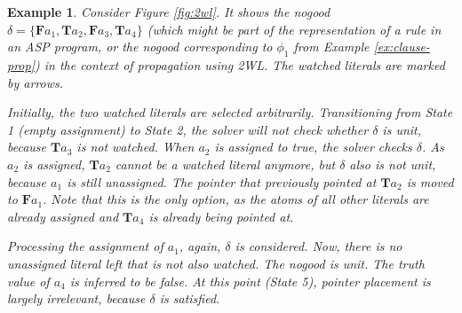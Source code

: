 \documentclass[final]{vutinfth} %
\newtheorem{example}{Example}[chapter]
\newcommand{\bT}{\mathbf{T}}
\newcommand{\bF}{\mathbf{F}}
\begin{document}
\begin{example}
Consider Figure \ref{fig:2wl}. It shows the nogood $\delta = \{\bF a_1, \bT a_2, \bF a_3, \bT a_4 \}$ (which might be part of the representation of a rule in an ASP program, or the nogood corresponding to $\phi_1$ from Example \ref{ex:clause-prop}) in the context of propagation using 2WL. The watched literals are marked by arrows.

Initially, the two watched literals are selected arbitrarily. Transitioning from State 1 (empty assignment) to State 2, the solver will not check whether $\delta$ is unit, because $\bT a_3$ is not watched. When $a_2$ is assigned to \emph{true}, the solver checks $\delta$. As $a_2$ is assigned, $\bT a_2$ cannot be a watched literal anymore, but $\delta$ also is not unit, because $a_1$ is still unassigned. The pointer that previously pointed at $\bT a_2$ is moved to $\bF a_1$. Note that this is the only option, as the atoms of all other literals are already assigned and $\bT a_4$ is already being pointed at.

Processing the assignment of $a_1$, again, $\delta$ is considered. Now, there is no unassigned literal left that is not also watched. The nogood is unit. The truth value of $a_4$ is inferred to be \emph{false}. At this point (State 5), pointer placement is largely irrelevant, because $\delta$ is satisfied.
\end{example}
\end{document}

